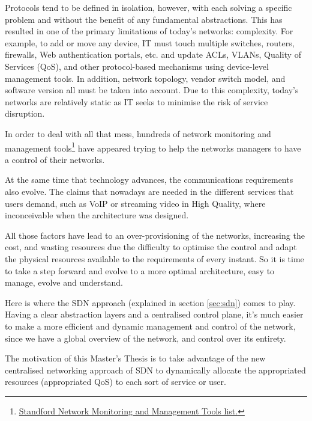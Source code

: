 Protocols tend to be defined in isolation, however, with each solving a specific problem and without the benefit of any fundamental abstractions. This has resulted in one of the primary limitations of today's networks: complexity. For example, to add or move any device, IT must touch multiple switches, routers, firewalls, Web authentication portals, etc. and update ACLs, VLANs, Quality of Services (QoS), and other protocol-based mechanisms using device-level management tools. In addition, network topology, vendor switch model, and software version all must be taken into account. Due to this complexity, today's networks are relatively static as IT seeks to minimise the risk of service disruption.

In order to deal with all that mess, hundreds of network monitoring and management tools\footnote{\href{http://www.slac.stanford.edu/xorg/nmtf/nmtf-tools.html}{Standford Network Monitoring and Management Tools list.}} have appeared trying to help the networks managers to have a control of their networks.

At the same time that technology advances, the communications requirements also evolve. The claims that nowadays are needed in the different services that users demand, such as VoIP or streaming video in High Quality, where inconceivable when the architecture was designed.  

All those factors have lead to an over-provisioning of the networks, increasing the cost, and wasting resources due the difficulty to optimise the control and adapt the physical resources available to the requirements of every instant. So it is time to take a step forward and evolve to a more optimal architecture, easy to manage, evolve and understand.  

Here is where the SDN approach (explained in section \ref{sec:sdn}) comes to play. Having a clear abstraction layers and a centralised control plane, it's much easier to make a more efficient and dynamic management and control of the network, since we have a global overview of the network, and control over its entirety.


The motivation of this Master's Thesis is to take advantage of the new centralised networking approach of SDN to dynamically allocate the appropriated resources (appropriated QoS) to each sort of service or user.    


